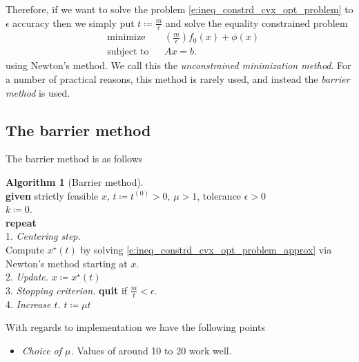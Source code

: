\documentclass[11pt]{amsart}
\theoremstyle{definition}
\newtheorem{algorithm}{Algorithm}[section]
\theoremstyle{remark}
\newcommand{\ind}{\hspace*{0.5cm}}
\begin{document}
        Therefore, if we want to solve the problem \eqref{e:ineq_constrd_cvx_opt_problem} to $\epsilon$ accuracy then we simply put $t \coloneqq \frac{m}{\epsilon}$ and solve the equality constrained problem 
        \begin{equation}\label{e:ineq_constrd_cvx_opt_problem_epsilon_approx}
            \begin{aligned}
            & {\text{minimize}} && 
            \left(\frac{m}{\epsilon}\right)f_0(x) + \phi(x)  \\
            & \text{subject to} && Ax = b.
            \end{aligned}
        \end{equation}
        using Newton's method. We call this the \emph{unconstrained minimization method}. For a number of practical reasons, this method is rarely used, and instead the \emph{barrier method} is used.

    \subsection{The barrier method}
        The barrier method is as follows
         \begin{algorithm}[Barrier method]
        \label{a:basic_conceptual_cp_alg}\mbox{}\\
            \ind \textbf{given} strictly feasible $x$, $t \coloneqq t^{(0)} > 0$, $\mu > 1$, tolerance $\epsilon > 0$ \\
            \ind $k \coloneqq 0$. \\
            \ind \textbf{repeat} \\
            \ind\ind 1. \emph{Centering step.} \\
            \ind\ind\ind Compute $x^\star(t)$ by solving \eqref{e:ineq_constrd_cvx_opt_problem_approx} via Newton's method starting at $x$. \\
            \ind\ind 2. \emph{Update.} $x \coloneqq x^\star(t)$ \\
            \ind\ind 3. \emph{Stopping criterion.} \textbf{quit} if $\frac{m}{t} < \epsilon$. \\
            \ind\ind 4. \emph{Increase $t$.} $t \coloneqq \mu t$
        \end{algorithm}

        With regards to implementation we have the following points
        \begin{itemize}
            \item \emph{Choice of $\mu$.} Values of around 10 to 20 work well. 
        \end{itemize}
\end{document}
